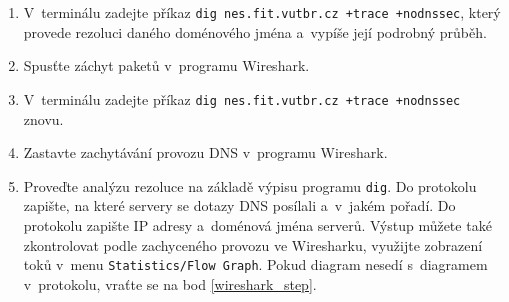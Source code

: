 \documentclass[a4paper,11pt]{article}
\begin{document}
\begin{enumerate}

  \item V~terminálu zadejte příkaz \texttt{dig nes.fit.vutbr.cz +trace +nodnssec}, který provede rezoluci daného doménového jména a~vypíše  její podrobný průběh.

  \item \label{wireshark_step} Spusťte záchyt paketů v~programu Wireshark.

  \item V~terminálu zadejte příkaz \texttt{dig nes.fit.vutbr.cz +trace +nodnssec} znovu.

  \item Zastavte zachytávání provozu DNS v~programu Wireshark.

  \item Proveďte analýzu rezoluce na základě výpisu programu {\tt dig}. Do protokolu zapište, na které servery se dotazy DNS posílali a~v~jakém pořadí. Do protokolu zapište IP adresy a~doménová jména serverů. Výstup můžete také zkontrolovat podle zachyceného provozu ve Wiresharku, využijte zobrazení toků v~menu {\tt Statistics/Flow Graph}. Pokud diagram nesedí s~diagramem v~protokolu, vraťte se na bod \ref{wireshark_step}.


\end{enumerate}
\end{document}
